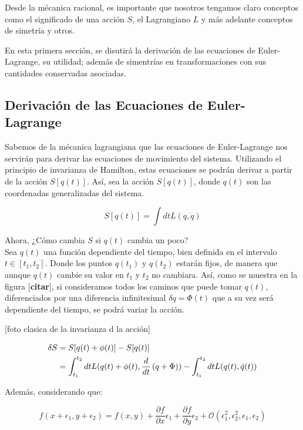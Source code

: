 \documentclass[../main.tex]{subfiles}
\begin{document}
Desde la mécanica racional, es importante que nosotros tengamos claro conceptos como el significado de una acción $S$, el Lagrangiano $L$ y más adelante conceptos de simetría y otros. 

En esta primera sección, se disutirá la derivación de las ecuaciones de Euler-Lagrange, su utilidad; además de simentrías en transformaciones con sus cantidades conservadas asociadas. 

\subsection{Derivación de las Ecuaciones de Euler-Lagrange}

Sabemos de la mécanica lagrangiana que las ecuaciones de Euler-Lagrange nos servirán para derivar las ecuaciones de movimiento del sistema. Utilizando el principio de invarianza de Hamilton, estas ecuaciones se podrán derivar a partir de la acción $S[q(t)]$. Así, sea la acción $S[q(t)]$, donde $q(t)$ son las coordenadas generalizadas del sistema. 

\begin{equation}
    S[q(t)] = \int dt L(q, \dot{q})
\end{equation} 

Ahora, ¿Cómo cambia $S$ si $q(t)$ cambia un poco?\\

Sea $q(t)$ una función dependiente del tiempo, bien definida en el intervalo $t \in [t_1 , t_2]$. Donde los puntos $q(t_1)$ y $q(t_2)$ estarán fijos, de manera que aunque $q(t)$ cambie su valor en $t_1$ y $t_2$ no cambiara. Así, como se muestra en la figura [\textbf{citar}], si consideramos todos los caminos que puede tomar $q(t)$, diferenciados por una diferencia infinitesimal $\delta q = \Phi(t)$ que a su vez será dependiente del tiempo, se podrá variar la acción. 


[foto clasica de la invarianza d la acción]


\begin{align}
    \delta S &= S[q(t) + \phi(t)] - S[q(t)] \notag \\
    &= \int_{t_1}^{t_2}dt L(q(t) + \phi(t), \frac{d}{dt}\left(q + \Phi \right)) -\int_{t_1}^{t_2}dt L(q(t), \dot{q}(t)) \label{var-accion1}\\
\end{align}

Además, considerando que: 

\begin{equation}\label{ec_1}
    f(x +\epsilon_1, y + \epsilon_2) = f(x,y) + \frac{\partial f}{\partial x}\epsilon_1 + \frac{\partial f}{\partial y}\epsilon_2 + \mathcal{O}(\epsilon_1^2, \epsilon_2^2, \epsilon_1, \epsilon_2) 
\end{equation}
\end{document}

